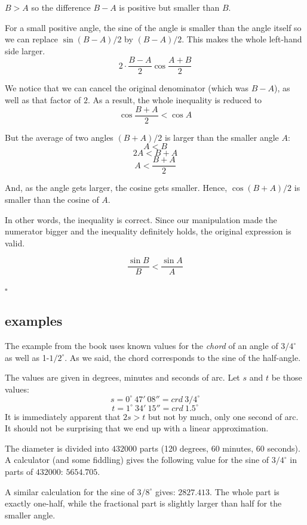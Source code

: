 \documentclass[11pt, oneside]{article}
\begin{document}
$B > A$ so the difference $B - A$ is positive but smaller than $B$.  

For a small positive angle, the sine of the angle is smaller than the angle itself so we can replace $\sin (B-A)/2$ by $(B - A)/2$.  This makes the whole left-hand side larger.
\[ 2 \cdot \frac{B - A}{2} \cos \frac{A + B}{2} \]

We notice that we can cancel the original denominator (which was $B - A$), as well as that factor of $2$.  As a result, the whole inequality is reduced to
\[  \cos \frac{B + A}{2} < \cos A \]

But the average of two angles $(B + A)/2$ is larger than the smaller angle $A$:
\[ A < B \]
\[ 2A < B + A \]
\[ A < \frac{B + A}{2} \]

And, as the angle gets larger, the cosine gets smaller.  Hence, $\cos (B + A)/2$ is smaller than the cosine of $A$.

In other words, the inequality is correct.  Since our manipulation made the numerator bigger and the inequality definitely holds, the original expression is valid.

\[ \frac{\sin B}{B} < \frac{\sin A}{A} \]

$\square$

\subsection*{examples}

The example from the book uses known values for the \emph{chord} of an angle of $3/4^{\circ}$ as well as 1-$1/2^{\circ}$.  As we said, the chord corresponds to the sine of the half-angle.

The values are given in degrees, minutes and seconds of arc.  Let $s$ and $t$ be those values:
\[ s = 0^{\circ}\ 47'\ 08'' = crd \ 3/4^{\circ} \]
\[ t = 1^{\circ}\ 34'\ 15'' = crd \ 1.5^{\circ} \]
It is immediately apparent that $2s > t$ but not by much, only one second of arc.  It should not be surprising that we end up with a linear approximation.

The diameter is divided into $432000$ parts (120 degrees, 60 minutes,  60 seconds).  A calculator (and some fiddling) gives the following value for the sine of $3/4^{\circ}$ in parts of $432000$:  $5654.705$.

A similar calculation for the sine of $3/8^{\circ}$ gives:  $2827.413$.  The whole part is exactly one-half, while the fractional part is slightly larger than half for the smaller angle.
\end{document}
